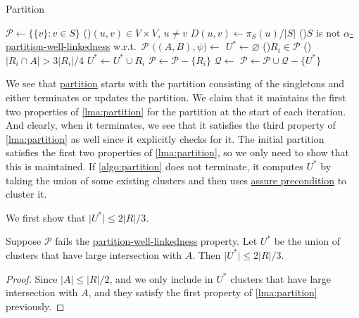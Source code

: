 \begin{algorithm}[H]\label{algo:partition}
	\DontPrintSemicolon{}
	\caption{Partition}

	\BlankLine

	\(\mathcal{P} \gets \{ \{ v \} \colon v \in S \} \)\;
	\;
	\For(){\((u, v) \in V \times V\), \(u \neq v\)}{
		\(D(u, v)\gets \pi _S(u) / \lvert S \rvert \)\;
	}
	\;
	\While(){\(S\) is not \hyperref[def:partition-and-boundary-well-linked]{\(\alpha \)-partition-well-linkedness} w.r.t.\ \(\mathcal{P} \)}{
		\(\big((A, B), \psi \big) \gets\)
		\(U^{\ast} \gets \varnothing \)\;
		\For(){\(R_i \in \mathcal{P} \)}{
			\If(){\(\lvert R_i \cap A \rvert > 3 \lvert R_i \rvert / 4\)}{
				\(U^{\ast} \gets U^{\ast} \cup R_i\)\;
				\(\mathcal{P} \gets \mathcal{P} - \{ R_i \} \)\;
			}
		}
		\(\mathcal{Q} \gets\)\;
		\(\mathcal{P} \gets \mathcal{P} \cup \mathcal{Q} - \{U^{\ast} \}\)\;
	}
	\;
\end{algorithm}

We see that \hyperref[algo:partition]{partition} starts with the partition consisting of the singletons and either terminates or updates the partition. We claim that it maintains the first two properties of \autoref{lma:partition} for the partition at the start of each iteration. And clearly, when it terminates, we see that it satisfies the third property of \autoref{lma:partition} as well since it explicitly checks for it. The initial partition satisfies the first two properties of \autoref{lma:partition}, so we only need to show that this is maintained. If \autoref{algo:partition} does not terminate, it computes \(U^{\ast} \) by taking the union of some existing clusters and then uses \hyperref[algo:assure-precondition]{assure precondition} to cluster it.

We first show that \(\lvert U^{\ast} \rvert \leq 2 \lvert R \rvert / 3\).
\begin{lemma}
	Suppose \(\mathcal{P} \) fails the \hyperref[def:partition-and-boundary-well-linked]{partition-well-linkedness} property. Let \(U^{\ast} \) be the union of clusters that have large intersection with \(A\). Then \(\lvert U^{\ast} \rvert \leq 2 \lvert R \rvert / 3\).
\end{lemma}
\begin{proof}
	Since \(\lvert A \rvert \leq \lvert R \rvert / 2\), and we only include in \(U^{\ast} \) clusters that have large intersection with \(A\), and they satisfy the first property of \autoref{lma:partition} previously.
\end{proof}

